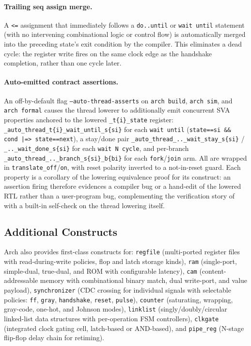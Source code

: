 \documentclass[manuscript]{acmart}
\begin{document}
\paragraph{Trailing seq assign merge.} A \texttt{<=} assignment that immediately follows a \texttt{do..until} or \texttt{wait until} statement (with no intervening combinational logic or control flow) is automatically merged into the preceding state's exit condition by the compiler. This eliminates a dead cycle: the register write fires on the same clock edge as the handshake completion, rather than one cycle later.

\paragraph{Auto-emitted contract assertions.} An off-by-default flag \texttt{--auto-thread-asserts} on \texttt{arch build}, \texttt{arch sim}, and \texttt{arch formal} causes the thread lowerer to additionally emit concurrent SVA properties anchored to the lowered \texttt{\_t\{i\}\_state} register: \texttt{\_auto\_thread\_t\{i\}\_wait\_until\_s\{si\}} for each \texttt{wait until} (\texttt{state==si \&\& cond |=> state==next}), a stay/done pair \texttt{\_auto\_thread\_..\_wait\_stay\_s\{si\}} / \texttt{\_..\_wait\_done\_s\{si\}} for each \texttt{wait N cycle}, and per-branch \texttt{\_auto\_thread\_..\_branch\_s\{si\}\_b\{bi\}} for each \texttt{fork}/\texttt{join} arm. All are wrapped in \texttt{translate\_off}/\texttt{on}, with reset polarity inverted to a not-in-reset guard. Each property is a corollary of the lowering equivalence proof for its construct: an assertion firing therefore evidences a compiler bug or a hand-edit of the lowered RTL rather than a user-program bug, complementing the verification story of  with a built-in self-check on the thread lowering itself.

\subsection{Additional Constructs}

Arch also provides first-class constructs for:
\texttt{regfile} (multi-ported register files with read-during-write policies, flop and latch storage kinds),
\texttt{ram} (single-port, simple-dual, true-dual, and ROM with configurable latency),
\texttt{cam} (content-addressable memory with combinational binary match, dual write-port, and value payload),
\texttt{synchronizer} (CDC crossing for individual signals with selectable policies: \texttt{ff}, \texttt{gray}, \texttt{handshake}, \texttt{reset}, \texttt{pulse}),
\texttt{counter} (saturating, wrapping, gray-code, one-hot, and Johnson modes),
\texttt{linklist} (singly/doubly/circular linked-list data structures with per-operation FSM controllers),
\texttt{clkgate} (integrated clock gating cell, latch-based or AND-based), and
\texttt{pipe\_reg} (N-stage flip-flop delay chain for retiming).
\end{document}
